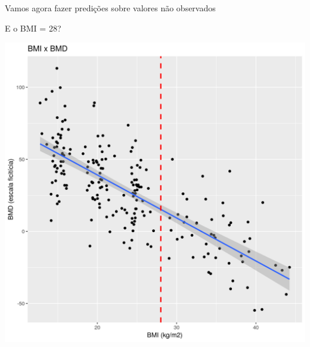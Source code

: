 \documentclass{beamer}
\begin{document}
\begin{frame}
  \begin{center}
    \Large
    Vamos agora fazer predições sobre valores não observados
  \end{center}
\end{frame}

\begin{frame}{E o BMI = 28?}
  \begin{center}
    \includegraphics[height=.9\textheight]{Cap18-19/pratica-plot3}
  \end{center}
\end{frame}
\end{document}
